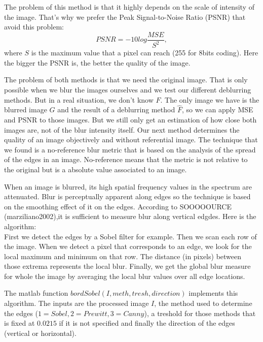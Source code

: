 The problem of this method is that it highly depends on the scale of intensity of the image. That's why we prefer the Peak Signal-to-Noise Ratio (PSNR) that avoid this problem:
\begin{equation}
PSNR = -10 log \frac{MSE}{S^2},
\end{equation}
where $S$ is the maximum value that a pixel can reach (255 for 8bits coding). Here the bigger the PSNR is, the better the quality of the image.

The problem of both methods is that we need the original image. That is only possible when we blur the images ourselves and we test our different deblurring methods. But in a real situation, we don't know $F$. The only image we have is the blurred image $G$ and the result of a deblurring method $\hat{F}$, so we can apply MSE and PSNR to those images. But we still only get an estimation of how close both images are, not of the blur intensity itself. Our next method determines the quality of an image objectively and without referential image. The technique that we found is a no-reference blur metric that is based on the analysis of the spread of the edges in an image. No-reference means that the metric is not relative to the original but is a absolute value associated to an image.

When an image is blurred, its high spatial frequency values in the spectrum are attenuated. Blur is perceptually apparent along edges so the technique is based on the smoothing effect of it on the edges. According to SOOOOOURCE (marziliano2002),it is sufficient to measure blur along vertical edgdes. Here is the algorithm:\\
First we detect the edges by a Sobel filter for example. Then we scan each row of the image. When we detect a pixel that corresponds to an edge, we look for the local maximum and minimum on that row. The distance (in pixels) between those extrema represents the local blur. Finally, we get the global blur measure for whole the image by averaging the local blur values over all edge locations.

The matlab function $bordSobel(I,meth,tresh,direction)$ implements this algorithm. The inputs are the processed image $I$, the method used to determine the edges ($1=Sobel, 2=Prewitt, 3=Canny$), a treshold for those methods that is fixed at $0.0215$ if it is not specified and finally the direction of the edges (vertical or horizontal).



